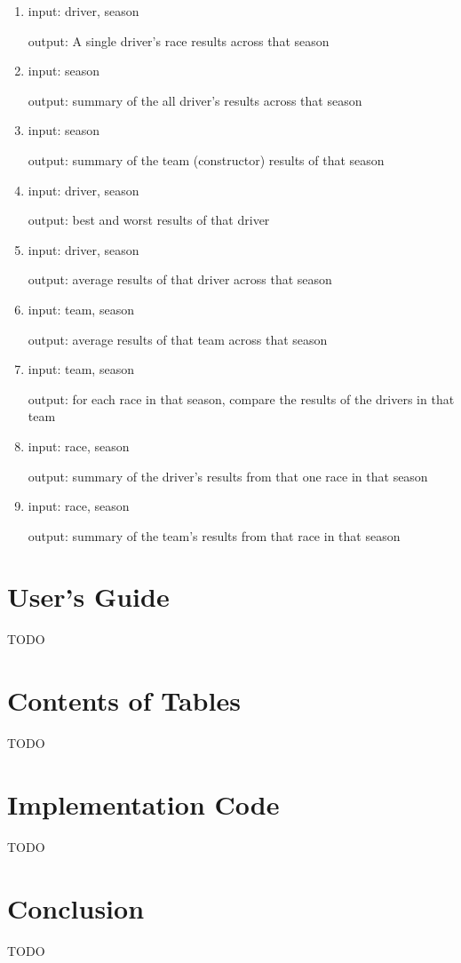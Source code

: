 \documentclass{article} %
\begin{document}
\begin{enumerate}[label=(\arabic*)]
    \item %
    input: driver, season

    output: A single driver's race results across that season 

    \item %
    input: season

    output: summary of the all driver's results across that season

    \item %
    input: season

    output: summary of the team (constructor) results of that season

    \item %
    input: driver, season

    output: best and worst results of that driver 

    \item %
    input: driver, season

    output: average results of that driver across that season

    \item %
    input: team, season

    output: average results of that team across that season

    \item %
    input: team, season 

    output: for each race in that season, compare the results of the
    drivers in that team

    \item %
    input: race, season 
    
    output: summary of the driver's results from that one race in that season

    \item %
    input: race, season 
    
    output: summary of the team's results from that race in that season

\end{enumerate}


\section{User's Guide}

TODO

\section{Contents of Tables}

TODO

\section{Implementation Code}

TODO

\section{Conclusion}

TODO
\end{document}
